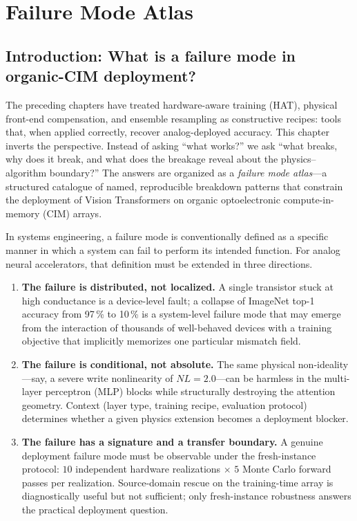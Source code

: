 \chapter{Failure Mode Atlas}
\label{chap:failure-mode-atlas}

\section{Introduction: What is a failure mode in organic-CIM deployment?}

The preceding chapters have treated hardware-aware training (HAT), physical front-end compensation, and ensemble resampling as constructive recipes: tools that, when applied correctly, recover analog-deployed accuracy.  This chapter inverts the perspective.  Instead of asking ``what works?'' we ask ``what breaks, why does it break, and what does the breakage reveal about the physics--algorithm boundary?''  The answers are organized as a \emph{failure mode atlas}---a structured catalogue of named, reproducible breakdown patterns that constrain the deployment of Vision Transformers on organic optoelectronic compute-in-memory (CIM) arrays.

In systems engineering, a failure mode is conventionally defined as a specific manner in which a system can fail to perform its intended function.  For analog neural accelerators, that definition must be extended in three directions.
\begin{enumerate}
    \item \textbf{The failure is distributed, not localized.}  A single transistor stuck at high conductance is a device-level fault; a collapse of ImageNet top-1 accuracy from 97\,\% to 10\,\% is a system-level failure mode that may emerge from the interaction of thousands of well-behaved devices with a training objective that implicitly memorizes one particular mismatch field.
    \item \textbf{The failure is conditional, not absolute.}  The same physical non-ideality---say, a severe write nonlinearity of $NL=2.0$---can be harmless in the multi-layer perceptron (MLP) blocks while structurally destroying the attention geometry.  Context (layer type, training recipe, evaluation protocol) determines whether a given physics extension becomes a deployment blocker.
    \item \textbf{The failure has a signature and a transfer boundary.}  A genuine deployment failure mode must be observable under the fresh-instance protocol: $10$ independent hardware realizations $\times$ $5$ Monte Carlo forward passes per realization.  Source-domain rescue on the training-time array is diagnostically useful but not sufficient; only fresh-instance robustness answers the practical deployment question.
\end{enumerate}

